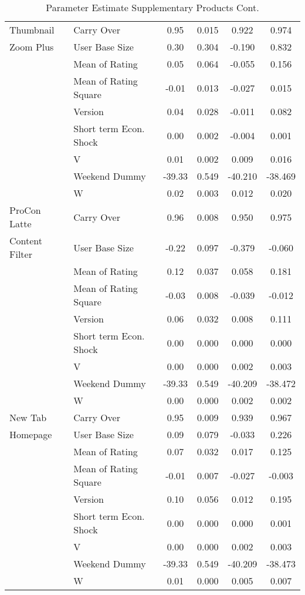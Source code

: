 \documentclass[mksc,nonblindrev]{informs3}
\begin{document}
\begin{table}
\begin{tabular}{llcccc}
Thumbnail	&	Carry Over	&	0.95	&	0.015	&	0.922	&	0.974	\\
 Zoom Plus	&	User Base Size	&	0.30	&	0.304	&	-0.190	&	0.832	\\
	&	Mean of Rating	&	0.05	&	0.064	&	-0.055	&	0.156	\\
	&	Mean of Rating Square	&	-0.01	&	0.013	&	-0.027	&	0.015	\\
	&	Version	&	0.04	&	0.028	&	-0.011	&	0.082	\\
	&	Short term Econ. Shock	&	0.00	&	0.002	&	-0.004	&	0.001	\\
	&	V	&	0.01	&	0.002	&	0.009	&	0.016	\\
	&	Weekend Dummy	&	-39.33	&	0.549	&	-40.210	&	-38.469	\\
	&	W	&	0.02	&	0.003	&	0.012	&	0.020	\\
ProCon Latte	&	Carry Over	&	0.96	&	0.008	&	0.950	&	0.975	\\
 Content Filter	&	User Base Size	&	-0.22	&	0.097	&	-0.379	&	-0.060	\\
	&	Mean of Rating	&	0.12	&	0.037	&	0.058	&	0.181	\\
	&	Mean of Rating Square	&	-0.03	&	0.008	&	-0.039	&	-0.012	\\
	&	Version	&	0.06	&	0.032	&	0.008	&	0.111	\\
	&	Short term Econ. Shock	&	0.00	&	0.000	&	0.000	&	0.000	\\
	&	V	&	0.00	&	0.000	&	0.002	&	0.003	\\
	&	Weekend Dummy	&	-39.33	&	0.549	&	-40.209	&	-38.472	\\
	&	W	&	0.00	&	0.000	&	0.002	&	0.002	\\
 New Tab	&	Carry Over	&	0.95	&	0.009	&	0.939	&	0.967	\\
 Homepage	&	User Base Size	&	0.09	&	0.079	&	-0.033	&	0.226	\\
	&	Mean of Rating	&	0.07	&	0.032	&	0.017	&	0.125	\\
	&	Mean of Rating Square	&	-0.01	&	0.007	&	-0.027	&	-0.003	\\
	&	Version	&	0.10	&	0.056	&	0.012	&	0.195	\\
	&	Short term Econ. Shock	&	0.00	&	0.000	&	0.000	&	0.001	\\
	&	V	&	0.00	&	0.000	&	0.002	&	0.003	\\
	&	Weekend Dummy	&	-39.33	&	0.549	&	-40.209	&	-38.473	\\
	&	W	&	0.01	&	0.000	&	0.005	&	0.007	\\
		\end{tabular}
	\caption{Parameter Estimate Supplementary Products Cont.}
	\label{tab:ParameterEstimateSupplementaryProducts}
\end{table}
\end{document}
